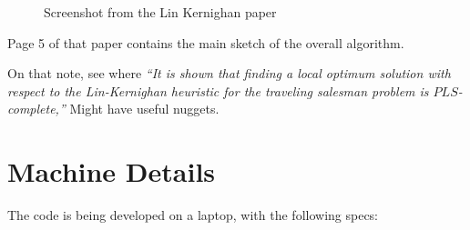 \begin{appendices}
\begin{description}
\begin{figure}[H]
  \centering
  \caption{\label{fig:linkernighan} Screenshot from the Lin Kernighan paper}
\end{figure}

Page 5 of that paper contains the main sketch of the overall algorithm. 

On that note, see \cite{papadimitriou1992complexity} 
where \textit{``It is shown that finding a local optimum solution with respect
to the Lin-Kernighan heuristic for the traveling salesman problem is $PLS$-complete,''} Might have useful nuggets. 


\end{description}


\newpage
\section{Machine Details}

The code is being developed on a laptop, with the following specs:


\end{appendices}
